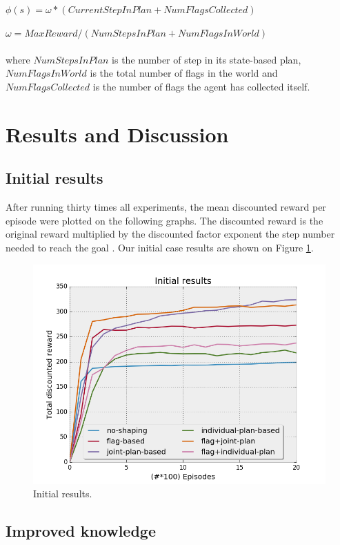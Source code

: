 \documentclass[letterpaper]{article}
\begin{document}
$\phi (s) = \omega * (CurrentStepInPlan + NumFlagsCollected)$

$\omega = MaxReward/(NumStepsInPlan + NumFlagsInWorld)$\\\\
where $NumStepsInPlan$ is the number of step in its state-based plan, $NumFlagsInWorld$ is the total number of flags in the world and $NumFlagsCollected$ is the number of flags the agent has collected itself.

\section{Results and Discussion}
\subsection{Initial results}

After running thirty times all experiments, the mean discounted reward per episode were plotted on the following graphs. The discounted reward is the original reward multiplied by the discounted factor exponent the step number needed to reach the goal  \citep{SCpbrs}. Our initial case results are shown on Figure \ref{fig:results1}. \\

\begin{figure}[h!]
  \includegraphics[width=\linewidth]{img/initial.png}
  \caption{Initial results.}
  \label{fig:results1}
\end{figure}

\subsection{Improved knowledge}
\end{document}
